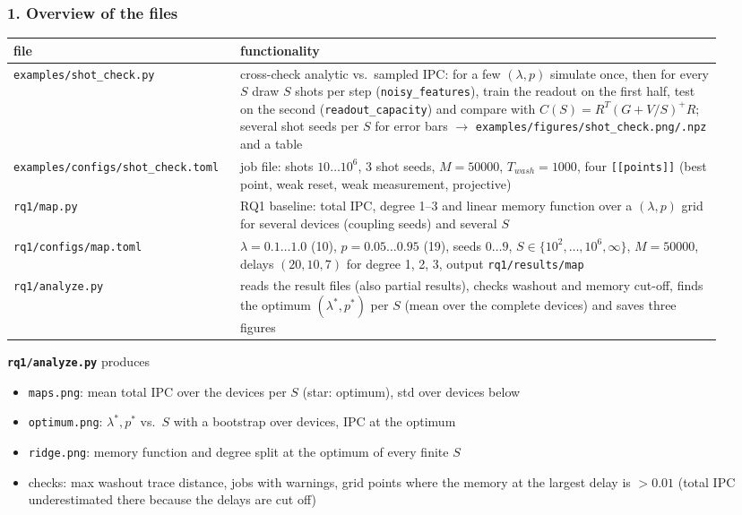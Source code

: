 \subsubsection*{1. Overview of the files}
\begin{center}
\begin{tabular}{p{0.27\linewidth}p{0.65\linewidth}}
    \hline
    file & functionality \\
    \hline
    \texttt{examples/shot\_check.py} & cross-check analytic vs.\ sampled IPC: for a few $(\lambda, p)$ simulate
    once, then for every $S$ draw $S$ shots per step (\texttt{noisy\_features}), train the readout on the first
    half, test on the second (\texttt{readout\_capacity}) and compare with $C(S) = R^T(G + V/S)^+R$;
    several shot seeds per $S$ for error bars $\to$ \texttt{examples/figures/shot\_check.png/.npz} and a table \\
    \texttt{examples/configs/shot\_check.toml} & job file: shots $10 \ldots 10^6$, 3 shot seeds, $M = 50000$,
    $T_{wash} = 1000$, four \texttt{[[points]]} (best point, weak reset, weak measurement, projective) \\
    \texttt{rq1/map.py} & RQ1 baseline: total IPC, degree 1--3 and linear memory function over a
    $(\lambda, p)$ grid for several devices (coupling seeds) and several $S$ \\
    \texttt{rq1/configs/map.toml} & $\lambda = 0.1 \ldots 1.0$ (10), $p = 0.05 \ldots 0.95$ (19), seeds $0 \ldots 9$,
    $S \in \{10^2, \ldots, 10^6, \infty\}$, $M = 50000$, delays $(20, 10, 7)$ for degree 1, 2, 3,
    output \texttt{rq1/results/map} \\
    \texttt{rq1/analyze.py} & reads the result files (also partial results), checks washout and
    memory cut-off, finds the optimum $(\lambda^*, p^*)$ per $S$ (mean over the complete devices) and saves
    three figures \\
    \hline
\end{tabular}
\end{center}

\textbf{\texttt{rq1/analyze.py}} produces
\begin{itemize}
    \item \texttt{maps.png}: mean total IPC over the devices per $S$ (star: optimum), std over devices below
    \item \texttt{optimum.png}: $\lambda^*, p^*$ vs.\ $S$ with a bootstrap over devices, IPC at the optimum
    \item \texttt{ridge.png}: memory function and degree split at the optimum of every finite $S$
    \item checks: max washout trace distance, jobs with warnings, grid points where the memory at the
    largest delay is $> 0.01$ (total IPC underestimated there because the delays are cut off)
\end{itemize}

